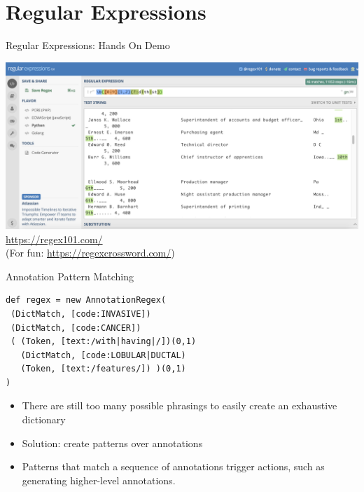 \documentclass[10pt]{beamer}
\begin{document}
\section{Regular Expressions}

\begin{frame}[fragile]{Regular Expressions: Hands On Demo}

\begin{center}
  \includegraphics[scale=0.25]{figures/regex101-screenshot.png}
  \\ \vspace{1em}
  \textcolor{blue}{\url{https://regex101.com/}}
  \\
  (For fun: \textcolor{blue}{\url{https://regexcrossword.com/}})
\end{center}

\end{frame}

\begin{frame}[fragile]{Annotation Pattern Matching}

\begin{lstlisting}[frame=single]
def regex = new AnnotationRegex(
 (DictMatch, [code:INVASIVE])
 (DictMatch, [code:CANCER])
 ( (Token, [text:/with|having|/])(0,1)
   (DictMatch, [code:LOBULAR|DUCTAL)
   (Token, [text:/features/]) )(0,1)
)
\end{lstlisting}

\begin{itemize}
	\item There are still too many possible phrasings to easily create an exhaustive dictionary
	\item Solution: create \alert{patterns} over annotations
	\item Patterns that match a sequence of annotations trigger \alert{actions}, such as generating higher-level annotations.
\end{itemize}

\end{frame}
\end{document}
